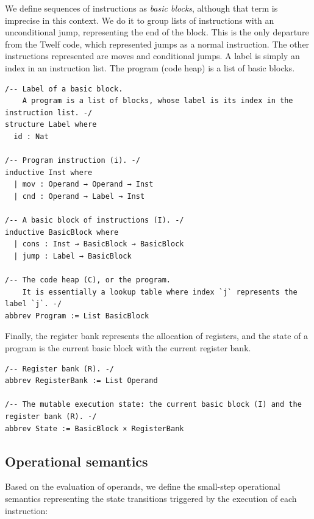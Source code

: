 \documentclass[]{NobArticle}
\begin{document}
We define sequences of instructions as \textit{basic blocks}, although that term is imprecise in this context. We do it to group lists of instructions with an unconditional jump, representing the end of the block. This is the only departure from the Twelf code, which represented jumps as a normal instruction. The other instructions represented are moves and conditional jumps. A label is simply an index in an instruction list. The program (code heap) is a list of basic blocks.

\begin{minipage}{\linewidth}
\begin{lstlisting}
/-- Label of a basic block.
    A program is a list of blocks, whose label is its index in the instruction list. -/
structure Label where
  id : Nat

/-- Program instruction (i). -/
inductive Inst where
  | mov : Operand → Operand → Inst
  | cnd : Operand → Label → Inst

/-- A basic block of instructions (I). -/
inductive BasicBlock where
  | cons : Inst → BasicBlock → BasicBlock
  | jump : Label → BasicBlock

/-- The code heap (C), or the program.
    It is essentially a lookup table where index `j` represents the label `j`. -/
abbrev Program := List BasicBlock
\end{lstlisting}
\end{minipage}

Finally, the register bank represents the allocation of registers, and the state of a program is the current basic block with the current register bank.

\begin{minipage}{\linewidth}
\begin{lstlisting}
/-- Register bank (R). -/
abbrev RegisterBank := List Operand

/-- The mutable execution state: the current basic block (I) and the register bank (R). -/
abbrev State := BasicBlock × RegisterBank
\end{lstlisting}
\end{minipage}

\subsection{Operational semantics}

Based on the evaluation of operands, we define the small-step operational semantics representing the state transitions triggered by the execution of each instruction:
\end{document}
